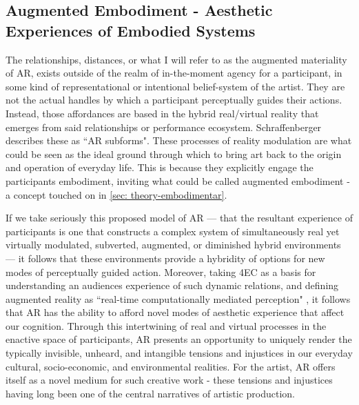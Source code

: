 \subsection[Augmented Embodiment]{Augmented Embodiment - Aesthetic Experiences of Embodied Systems} \label{sec: discussion-medium-embodiment}
The relationships, distances, or what I will refer to as the augmented materiality of AR, exists outside of the realm of in-the-moment agency for a participant, in some kind of representational or intentional belief-system of the artist. They are not the actual handles by which a participant perceptually guides their actions. Instead, those affordances are based in the hybrid real/virtual reality that emerges from said relationships or performance ecosystem. Schraffenberger describes these as ``AR subforms". These processes of reality modulation are what could be seen as the ideal ground through which to bring art back to the origin and operation of everyday life. This is because they explicitly engage the participants embodiment, inviting what could be called augmented embodiment - a concept touched on in \autoref{sec: theory-embodimentar}.

If we take seriously this proposed model of AR — that the resultant experience of participants is one that constructs a complex system of simultaneously real yet virtually modulated, subverted, augmented, or diminished hybrid environments — it follows that these environments provide a hybridity of options for new modes of perceptually guided action. Moreover, taking 4EC as a basis for understanding an audiences experience of such dynamic relations, and defining augmented reality as ``real-time computationally mediated perception" \citep[]{chevalier2020}, it follows that AR has the ability to afford novel modes of aesthetic experience that affect our cognition. Through this intertwining of real and virtual processes in the enactive space of participants, AR presents an opportunity to uniquely render the typically invisible, unheard, and intangible tensions and injustices in our everyday cultural, socio-economic, and environmental realities. For the artist, AR offers itself as a novel medium for such creative work - these tensions and injustices having long been one of the central narratives of artistic production.


